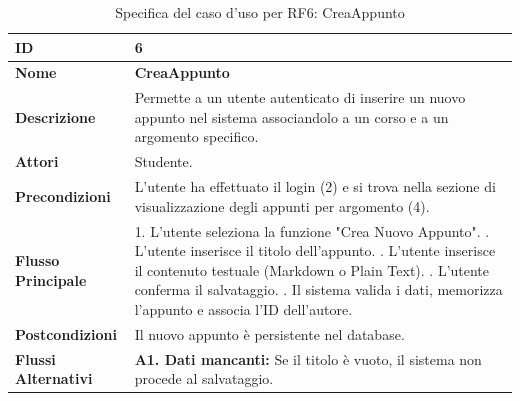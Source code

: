 \begin{table}[H]
    \small
    \caption{Specifica del caso d'uso per RF6: CreaAppunto}
    \label{tab:spec_uc6}
    \begin{tabularx}{\textwidth}{@{}l X@{}}
        \toprule
        \textbf{ID} & 6 \\
        \midrule
        \textbf{Nome} & \textbf{CreaAppunto} \\
        \midrule
        \textbf{Descrizione} & Permette a un utente autenticato di inserire un nuovo appunto nel sistema associandolo a un corso e a un argomento specifico. \\
        \midrule
        \textbf{Attori} & Studente. \\
        \midrule
        \textbf{Precondizioni} & L'utente ha effettuato il login (2) e si trova nella sezione di visualizzazione degli appunti per argomento (4). \\
        \midrule
        \textbf{Flusso Principale} & 
        1. L'utente seleziona la funzione "Crea Nuovo Appunto". \newline
        2. L'utente inserisce il titolo dell'appunto. \newline
        3. L'utente inserisce il contenuto testuale (Markdown o Plain Text). \newline
        4. L'utente conferma il salvataggio. \newline
        5. Il sistema valida i dati, memorizza l'appunto e associa l'ID dell'autore. \\
        \midrule
        \textbf{Postcondizioni} & Il nuovo appunto è persistente nel database. \\
        \midrule
        \textbf{Flussi Alternativi} & \textbf{A1. Dati mancanti:} Se il titolo è vuoto, il sistema non procede al salvataggio. \\
        \bottomrule
    \end{tabularx}
\end{table}

